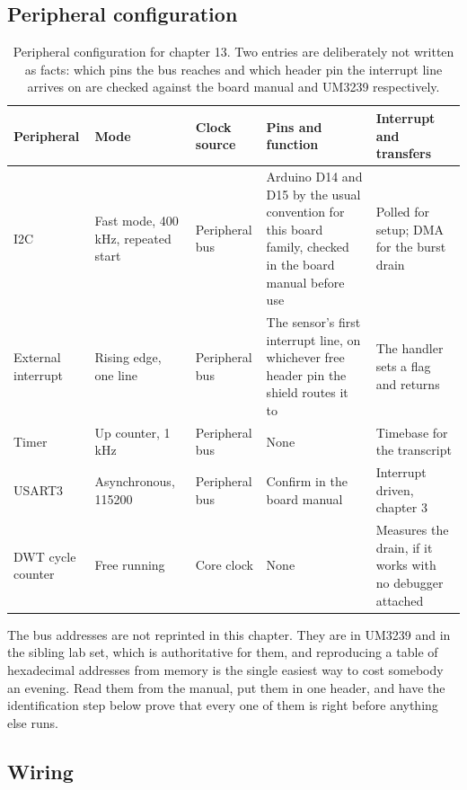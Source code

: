 \subsection*{Peripheral configuration}

\begin{table}[H]\centering\small
\begin{tabular}{p{22mm}p{26mm}p{24mm}p{30mm}p{30mm}}
\toprule
Peripheral & Mode & Clock source & Pins and function & Interrupt and transfers \\
\midrule
I2C & Fast mode, 400 kHz, repeated start & Peripheral bus & Arduino D14 and D15 by the usual convention for this board family, checked in the board manual before use & Polled for setup; DMA for the burst drain \\
External interrupt & Rising edge, one line & Peripheral bus & The sensor's first interrupt line, on whichever free header pin the shield routes it to & The handler sets a flag and returns \\
Timer & Up counter, 1 kHz & Peripheral bus & None & Timebase for the transcript \\
USART3 & Asynchronous, 115200 & Peripheral bus & Confirm in the board manual & Interrupt driven, chapter 3 \\
DWT cycle counter & Free running & Core clock & None & Measures the drain, if it works with no debugger attached \\
\bottomrule
\end{tabular}
\caption{Peripheral configuration for chapter 13. Two entries are deliberately not written as facts: which pins the bus reaches and which header pin the interrupt line arrives on are checked against the board manual and UM3239 respectively.}
\end{table}

The bus addresses are not reprinted in this chapter. They are in UM3239 and in
the sibling lab set, which is authoritative for them, and reproducing a table of
hexadecimal addresses from memory is the single easiest way to cost somebody an
evening. Read them from the manual, put them in one header, and have the
identification step below prove that every one of them is right before anything
else runs.

\subsection*{Wiring}


